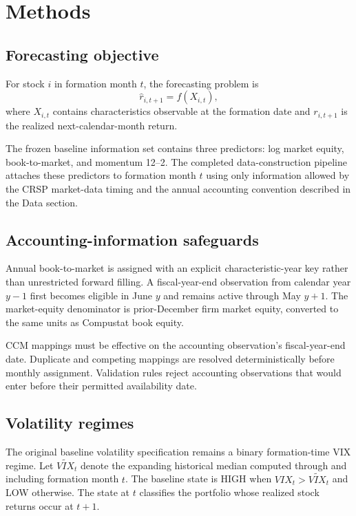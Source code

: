 \section{Methods}

\subsection{Forecasting objective}

For stock $i$ in formation month $t$, the forecasting problem is
\begin{equation}
\widehat{r}_{i,t+1} = f\left(X_{i,t}\right),
\end{equation}
where $X_{i,t}$ contains characteristics observable at the formation date and $r_{i,t+1}$ is the realized next-calendar-month return.

The frozen baseline information set contains three predictors: log market equity, book-to-market, and momentum 12--2. The completed data-construction pipeline attaches these predictors to formation month $t$ using only information allowed by the CRSP market-data timing and the annual accounting convention described in the Data section.

\subsection{Accounting-information safeguards}

Annual book-to-market is assigned with an explicit characteristic-year key rather than unrestricted forward filling. A fiscal-year-end observation from calendar year $y-1$ first becomes eligible in June $y$ and remains active through May $y+1$. The market-equity denominator is prior-December firm market equity, converted to the same units as Compustat book equity.

CCM mappings must be effective on the accounting observation's fiscal-year-end date. Duplicate and competing mappings are resolved deterministically before monthly assignment. Validation rules reject accounting observations that would enter before their permitted availability date.

\subsection{Volatility regimes}

The original baseline volatility specification remains a binary formation-time VIX regime. Let $\widetilde{VIX}_t$ denote the expanding historical median computed through and including formation month $t$. The baseline state is HIGH when $VIX_t>\widetilde{VIX}_t$ and LOW otherwise. The state at $t$ classifies the portfolio whose realized stock returns occur at $t+1$.

